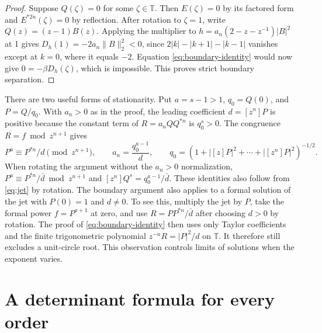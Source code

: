 \documentclass[11pt]{article}
\newcommand{\T}{\mathbb T}
\newcommand{\coef}[1]{[z^{#1}]}
\begin{document}
\begin{proof}
Suppose \(Q(\zeta)=0\) for some \(\zeta\in\T\). Then \(E(\zeta)=0\)
by its factored form and \(E^{*2n}(\zeta)=0\) by reflection.
After rotation to \(\zeta=1\), write \(Q(z)=(z-1)B(z)\).
Applying the multiplier to
\(h=a_n(2-z-z^{-1})|B|^2\) at 1 gives
\(D_h(1)=-2a_n\|B\|_2^2<0\), since
\(2|k|-|k+1|-|k-1|\) vanishes except at \(k=0\), where it
equals \(-2\). Equation \eqref{eq:boundary-identity} would now give
\(0=-\beta D_h(\zeta)\), which is impossible. This proves strict
boundary separation.
\end{proof}

There are two useful forms of stationarity. Put \(a=s-1>1\),
\(q_0=Q(0)\), and \(P=Q/q_0\). With \(a_n>0\) as in the proof,
the leading coefficient \(d=\coef n P\) is positive because the
constant term of \(R=a_n QQ^{*n}\) is \(q_0^s>0\).
The congruence \(R=f\bmod z^{n+1}\) gives
\begin{equation}\label{eq:jet}
 P^a\equiv P^{*n}/d\pmod{z^{n+1}},\qquad
 a_n=\frac{q_0^{a-1}}{d},\qquad
 q_0=(1+|[z]P|^2+\cdots+|\coef nP|^2)^{-1/2}.
\end{equation}
When rotating the argument without the \(a_n>0\) normalization,
\(P^a\equiv P^{*n}/\bar d\bmod z^{n+1}\) and
\(\coef n Q^s=q_0^{a-1}/\bar d\). These identities also follow
from \eqref{eq:jet} by rotation.
The boundary argument also applies to a formal solution of the
jet with \(P(0)=1\) and \(d\ne0\). To see this, multiply the
jet by \(P\), take the formal power \(f=P^{a+1}\) at zero, and
use \(R=PP^{*n}/\bar d\) after choosing \(d>0\) by rotation.
The proof of \eqref{eq:boundary-identity} then uses only Taylor
coefficients and the finite trigonometric polynomial
\(z^{-n}R=|P|^2/d\) on \(\T\). It therefore still excludes a
unit-circle root. This observation controls limits of solutions
when the exponent varies.

\section{A determinant formula for every order}\label{sec:all-n-det}
\end{document}
